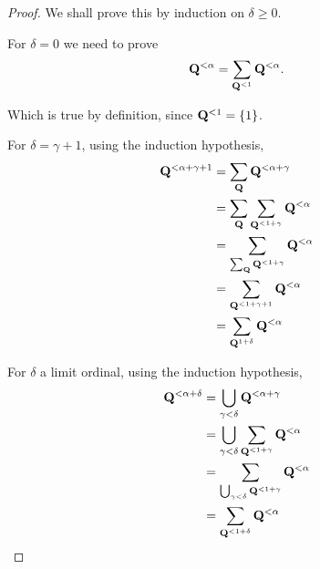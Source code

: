 \begin{proof}
  We shall prove this by induction on $\delta \ge 0$.

  For $\delta = 0$ we need to prove
  \[
    \mathbf{Q}^{< \alpha} = \sum_{\mathbf{Q}^{< 1}}{\mathbf{Q}^{< \alpha}}.
  \]

  Which is true by definition, since $\mathbf{Q}^{< 1} = \left\{ {1} \right\}$.

  For $\delta = \gamma + 1$, using the induction hypothesis,
  \[
    \begin{aligned}
      \mathbf{Q}^{< \alpha + \gamma + 1}
       & = \sum_{\mathbf{Q}}{\mathbf{Q}^{< \alpha + \gamma}}                   \\
       & = \sum_{\mathbf{Q}}{\sum_{\mathbf{Q}^{< 1 + \gamma}}{\mathbf{Q}^{< \alpha}}} \\
       & = \sum_{\sum_{\mathbf{Q}}{\mathbf{Q}^{< 1 + \gamma}}}{\mathbf{Q}^{< \alpha}} \\
       & = \sum_{\mathbf{Q}^{< 1 + \gamma + 1}}{\mathbf{Q}^{< \alpha}}         \\
       & = \sum_{\mathbf{Q}^{1 + \delta}}{\mathbf{Q}^{< \alpha}}
    \end{aligned}
  \]

  For $\delta$ a limit ordinal, using the induction hypothesis,
  \[
    \begin{aligned}
      \mathbf{Q}^{< \alpha + \delta}
       & = \bigcup_{\gamma < \delta}{\mathbf{Q}^{< \alpha + \gamma}}                   \\
       & = \bigcup_{\gamma < \delta}{\sum_{\mathbf{Q}^{< 1 + \gamma}}{\mathbf{Q}^{< \alpha}}} \\
       & = \sum_{\bigcup_{\gamma < \delta}{\mathbf{Q}^{< 1 + \gamma}}}{\mathbf{Q}^{< \alpha}} \\
       & = \sum_{\mathbf{Q}^{< 1 + \delta}}{\mathbf{Q}^{< \alpha}}
    \end{aligned}
  \]

\end{proof}

